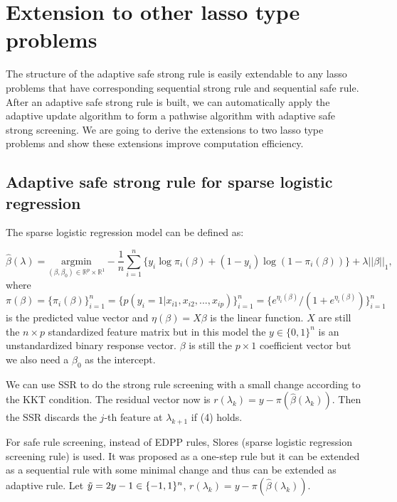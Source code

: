 \documentclass{article}
\begin{document}
\section{Extension to other lasso type problems}
\label{sec:4}

The structure of the adaptive safe strong rule is easily extendable to any lasso problems that have corresponding sequential strong rule and sequential safe rule. After an adaptive safe strong rule is built, we can automatically apply the adaptive update algorithm to form a pathwise algorithm with adaptive safe strong screening. We are going to derive the extensions to two lasso type problems and show these extensions improve computation efficiency.

\subsection{Adaptive safe strong rule for sparse logistic regression}

The sparse logistic regression model can be defined as:

\begin{equation}
    \hat{\beta}(\lambda)=\underset{(\beta,\beta_0)\in \mathbb{R}^p\times\mathbb{R}^1}{\mathrm{argmin}}-\frac{1}{n}\sum_{i=1}^n\{y_i\log\pi_i(\beta)+(1-y_i)\log(1-\pi_i(\beta))\}+\lambda||\beta||_1,
\end{equation}
where $\pi(\beta)=\{\pi_i(\beta)\}_{i=1}^n=\{p(y_i=1|x_{i1},x_{i2},...,x_{ip})\}_{i=1}^n=\{e^{\eta_i(\beta)}/(1+e^{\eta_i(\beta)})\}_{i=1}^n$ is the predicted value vector and $\eta(\beta)=X\beta$ is the linear function. $X$ are still the $n\times p$ standardized feature matrix but in this model the $y\in\{0,1\}^n$ is an unstandardized binary response vector. $\beta$ is still the $p\times1$ coefficient vector but we also need a $\beta_0$ as the intercept.

We can use SSR to do the strong rule screening with a small change according to the KKT condition. The residual vector now is $r(\lambda_k)=y-\pi(\hat{\beta}(\lambda_k))$. Then the SSR discards the $j$-th feature at $\lambda_{k+1}$ if (4) holds.

For safe rule screening, instead of EDPP rules, Slores (sparse logistic regression screening rule)\citep{wang2014safe} is used. It was proposed as a one-step rule but it can be extended as a sequential rule with some minimal change and thus can be extended as adaptive rule. Let $\Tilde{y}=2y-1\in\{-1,1\}^n$, $r(\lambda_k)=y-\pi(\hat{\beta}(\lambda_k))$.
\end{document}
